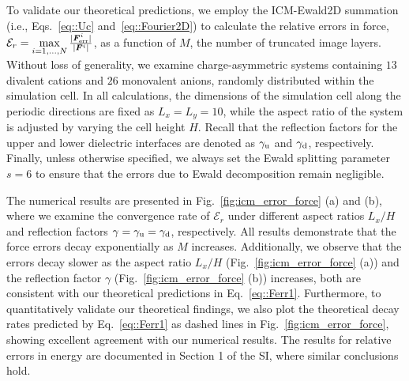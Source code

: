 To validate our theoretical predictions, we employ the ICM-Ewald2D summation (i.e., Eqs.~\eqref{eq::Uc} and~\eqref{eq::Fourier2D}) to calculate the relative errors in force, $\mathcal{E}_r = \max\limits_{i=1,\ldots,N}\frac{\lvert\bm{F}^i_{\text{err}}\rvert}{\lvert\bm{F}^i\rvert}$, as a function of $M$, the number of truncated image layers.
Without loss of generality, we examine charge-asymmetric systems containing $13$ divalent cations and $26$ monovalent anions, randomly distributed within the simulation cell. 
In all calculations, the dimensions of the simulation cell along the periodic directions are fixed as $L_x = L_y = 10$, while the aspect ratio of the system is adjusted by varying the cell height $H$. 
Recall that the reflection factors for the upper and lower dielectric interfaces are denoted as $\gamma_{\text{u}}$ and $\gamma_{\text{d}}$, respectively. 
Finally, unless otherwise specified, we always set the Ewald splitting parameter $s=6$ to ensure that the errors due to Ewald decomposition remain negligible. 



The numerical results are presented in Fig.~\ref{fig:icm_error_force} (a) and (b), where we examine the convergence rate of $\mathcal{E}_r$ under different aspect ratios $L_x / H$ and reflection factors $\gamma=\gamma_{\text{u}}=\gamma_{\text{d}}$, respectively.
All results demonstrate that the force errors decay exponentially as $M$ increases. 
Additionally, we observe that the errors decay slower as the aspect ratio $L_x / H$ (Fig.~\ref{fig:icm_error_force} (a)) and the reflection factor $\gamma$ (Fig.~\ref{fig:icm_error_force} (b)) increases, both are consistent with our theoretical predictions in Eq.~\eqref{eq::Ferr1}. 
Furthermore, to quantitatively validate our theoretical findings, we also plot the theoretical decay rates predicted by Eq.~\eqref{eq::Ferr1} as dashed lines in Fig.~\ref{fig:icm_error_force}, showing excellent agreement with our numerical results.
The results for relative errors in energy are documented in Section 1 of the SI, where similar conclusions hold.  


